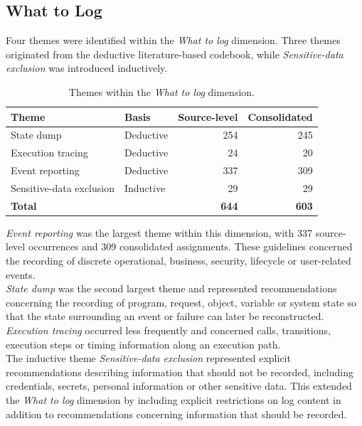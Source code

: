 \subsection{What to Log}

Four themes were identified within the \textit{What to log} dimension. Three
themes originated from the deductive literature-based codebook, while
\textit{Sensitive-data exclusion} was introduced inductively.

\begin{table}[H]
    \centering

    \begin{tabularx}{\textwidth}{X l rr}
        \toprule
        \textbf{Theme} &
        \textbf{Basis} &
        \textbf{Source-level} &
        \textbf{Consolidated} \\
        \midrule
        State dump & Deductive & 254 & 245 \\
        Execution tracing & Deductive & 24 & 20 \\
        Event reporting & Deductive & 337 & 309 \\
        Sensitive-data exclusion & Inductive & 29 & 29 \\
        \midrule
        \textbf{Total} & & \textbf{644} & \textbf{603} \\
        \bottomrule
    \end{tabularx}

    \caption{Themes within the \textit{What to log} dimension.}
    \label{tab:themes-what-to-log}
\end{table}

\textit{Event reporting} was the largest theme within this dimension, with 337
source-level occurrences and 309 consolidated assignments. These guidelines
concerned the recording of discrete operational, business, security, lifecycle or
user-related events.
\\
\textit{State dump} was the second largest theme and represented recommendations
concerning the recording of program, request, object, variable or system state so
that the state surrounding an event or failure can later be reconstructed.
\\
\textit{Execution tracing} occurred less frequently and concerned calls,
transitions, execution steps or timing information along an execution path.
\\
The inductive theme \textit{Sensitive-data exclusion} represented explicit
recommendations describing information that should not be recorded, including
credentials, secrets, personal information or other sensitive data. This extended
the \textit{What to log} dimension by including explicit restrictions on log
content in addition to recommendations concerning information that should be
recorded.


